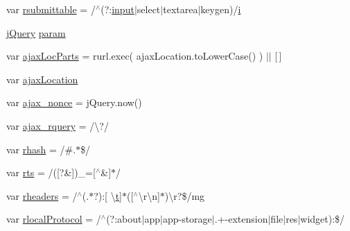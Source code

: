 \begin{DoxyCompactItemize}
\item 
var \hyperlink{obj_2_release_2_package_2_package_tmp_2_scripts_2jquery-1_810_82_8js_a12d248d7e6c5985c5ea21f56fbef9e90}{rsubmittable} = /$^\wedge$(?\+:\hyperlink{jquery_8unobtrusive-ajax_8min_8js_a22211e450825dd03852dfba097324407}{input}$\vert$select$\vert$textarea$\vert$keygen)/\hyperlink{jquery_8unobtrusive-ajax_8min_8js_a84da5ff1aa6008a770fb28040f6b0569}{i}
\item 
\hyperlink{_scripts_2jquery-1_810_82_8js_a5e01048fbd3a30b44e8d491d8945c457}{j\+Query} \hyperlink{obj_2_release_2_package_2_package_tmp_2_scripts_2jquery-1_810_82_8js_a24ced9cd3c9e1970a8cbe8d7adedc765}{param}
\item 
var \hyperlink{obj_2_release_2_package_2_package_tmp_2_scripts_2jquery-1_810_82_8js_a4c35110da3c335cfca38505ee65a5e79}{ajax\+Loc\+Parts} = rurl.\+exec( ajax\+Location.\+to\+Lower\+Case() ) $\vert$$\vert$ \mbox{[}$\,$\mbox{]}
\item 
var \hyperlink{obj_2_release_2_package_2_package_tmp_2_scripts_2jquery-1_810_82_8js_a1661d4e1676e7c6ffde5a3cb8d8ae246}{ajax\+Location}
\item 
var \hyperlink{obj_2_release_2_package_2_package_tmp_2_scripts_2jquery-1_810_82_8js_aaa43e6d4c76ee8be878dd7e93fb755a4}{ajax\+\_\+nonce} = j\+Query.\+now()
\item 
var \hyperlink{obj_2_release_2_package_2_package_tmp_2_scripts_2jquery-1_810_82_8js_a4da85c0011217bf1643139dc23999c5c}{ajax\+\_\+rquery} = /\textbackslash{}?/
\item 
var \hyperlink{obj_2_release_2_package_2_package_tmp_2_scripts_2jquery-1_810_82_8js_a6990b6955b6bec9dd39f3814cfb56d6d}{rhash} = /\#.$\ast$\$/
\item 
var \hyperlink{obj_2_release_2_package_2_package_tmp_2_scripts_2jquery-1_810_82_8js_a38ff30904f54277281a13514d7aea00d}{rts} = /(\mbox{[}?\&\mbox{]})\+\_\+=\mbox{[}$^\wedge$\&\mbox{]}$\ast$/
\item 
var \hyperlink{obj_2_release_2_package_2_package_tmp_2_scripts_2jquery-1_810_82_8js_af506d11612139f03091db71089d92e8b}{rheaders} = /$^\wedge$(.$\ast$?)\+:\mbox{[} \textbackslash{}\hyperlink{_scripts_2jquery_8validate_8min_8js_a23c5666e83bbbceee94adcd0851f50c4}{t}\mbox{]}$\ast$(\mbox{[}$^\wedge$\textbackslash{}r\textbackslash{}n\mbox{]}$\ast$)\textbackslash{}r?\$/mg
\item 
var \hyperlink{obj_2_release_2_package_2_package_tmp_2_scripts_2jquery-1_810_82_8js_af4dd13c90298bbf53ce08ec707dc9e2a}{rlocal\+Protocol} = /$^\wedge$(?\+:about$\vert$app$\vert$app-\/storage$\vert$.+-\/extension$\vert$file$\vert$res$\vert$widget)\+:\$/
$$
\end{DoxyCompactItemize}
